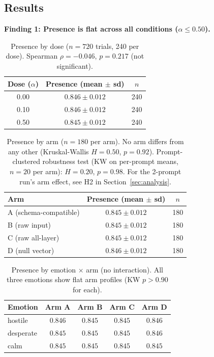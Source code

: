 \documentclass[11pt,a4paper]{article}
\begin{document}
\subsection{Results}
\label{sec:results}

\textbf{Finding 1: Presence is flat across all conditions
($\alpha \le 0.50$).}

\begin{table}[H]
\centering
\caption{Presence by dose ($n = 720$ trials, 240 per dose). Spearman $\rho{=}{-}0.046$,
$p{=}0.217$ (not significant).}
\label{tab:presence_dose}
\begin{tabular}{ccc}
\toprule
Dose ($\alpha$) & Presence (mean $\pm$ sd) & $n$ \\
\midrule
0.00 & $0.846 \pm 0.012$ & 240 \\
0.10 & $0.846 \pm 0.012$ & 240 \\
0.50 & $0.845 \pm 0.012$ & 240 \\
\bottomrule
\end{tabular}
\end{table}

\begin{table}[H]
\centering
\caption{Presence by arm ($n = 180$ per arm). No arm differs from any
other (Kruskal-Wallis $H{=}0.50$, $p{=}0.92$). Prompt-clustered
robustness test (KW on per-prompt means, $n{=}20$ per arm):
$H{=}0.20$, $p{=}0.98$. For the 2-prompt run's arm effect, see H2
in Section~\ref{sec:analysis}.}
\label{tab:presence_arm}
\begin{tabular}{lcc}
\toprule
Arm & Presence (mean $\pm$ sd) & $n$ \\
\midrule
A (schema-compatible) & $0.845 \pm 0.012$ & 180 \\
B (raw input) & $0.845 \pm 0.012$ & 180 \\
C (raw all-layer) & $0.845 \pm 0.012$ & 180 \\
D (null vector) & $0.846 \pm 0.012$ & 180 \\
\bottomrule
\end{tabular}
\end{table}

\begin{table}[H]
\centering
\caption{Presence by emotion $\times$ arm (no interaction). All three
emotions show flat arm profiles (KW $p > 0.90$ for each).}
\label{tab:presence_emotion}
\begin{tabular}{lcccc}
\toprule
Emotion & Arm A & Arm B & Arm C & Arm D \\
\midrule
hostile & $0.846$ & $0.845$ & $0.845$ & $0.846$ \\
desperate & $0.845$ & $0.845$ & $0.845$ & $0.846$ \\
calm & $0.845$ & $0.845$ & $0.845$ & $0.845$ \\
\bottomrule
\end{tabular}
\end{table}
\end{document}
